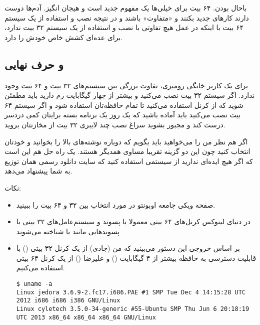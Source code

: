 باحال بودن. ۶۴ بیت برای خیلی‌ها یک مفهوم جدید است و هیجان انگیز. آدم‌ها دوست دارند کارهای جدید بکنند و «متفاوت» باشند و در نتیجه نصب و استفاده از یک سیستم ۶۴ بیت با اینکه در عمل هیچ تفاوتی با نصب و استفاده از یک سیستم ۳۲ بیت ندارد، برای عده‌ای کشش خاص خودش را دارد.

\subsection*{و حرف نهایی}
برای یک کاربر خانگی رومیزی، تفاوت بزرگی بین سیستم‌های ۳۲ بیت و ۶۴ بیت وجود ندارد. اگر سیستم ۳۲ بیت نصب می‌کنید و بیشتر از چهار گیگابایت رم دارید باید مطمئن شوید که از کرنل 
 استفاده می‌کنید تا تمام حافظه‌تان استفاده شود و اگر سیستم ۶۴ بیت نصب می‌کنید باید آماده باشید که یک روز یک برنامه بسته برایتان کمی دردسر درست کند و مجبور بشوید سراغ نصب چند لایبری ۳۲ بیت از مخازنتان بروید.
 
اگر هم نظر من را می‌خواهید باید بگویم که دوباره نوشته‌های بالا را بخوانید و خودتان انتخاب کنید چون این دو گزینه تقریبا مساوی همدیگر هستند. یک راه حل هم این است که اگر هیچ ایده‌ای ندارید از سیستمی استفاده کنید که سایت دانلود رسمی همان توزیع به شما پیشنهاد می‌دهد.

نکات:
\begin{itemize}
\item صفحه ویکی جامعه اوبونتو در مورد انتخاب بین ۳۲ و ۶۴ بیت را ببینید.

\item در دنیای لینوکس کرنل‌های ۶۴ بیتی معمولا با پسوند 
و سیستم‌عامل‌های ۳۲ بیتی با پسوندهایی مانند 
 یا 
 شناخته می‌شوند
\item بر اساس خروجی این دستور می‌بینید که من (جادی) از یک کرنل ۳۲ بیتی () با قابلیت دسترسی به حافظه بیشتر از ۴ گیگابایت () و علیرضا () از یک کرنل ۶۴ بیتی استفاده می‌کنیم.

\begin{frameng}
\begin{lstlisting}
$ uname -a 
Linux jedora 3.6.9-2.fc17.i686.PAE #1 SMP Tue Dec 4 14:15:28 UTC 2012 i686 i686 i386 GNU/Linux
Linux cyletech 3.5.0-34-generic #55-Ubuntu SMP Thu Jun 6 20:18:19 UTC 2013 x86_64 x86_64 x86_64 GNU/Linux
\end{lstlisting}
\end{frameng}
\end{itemize}
